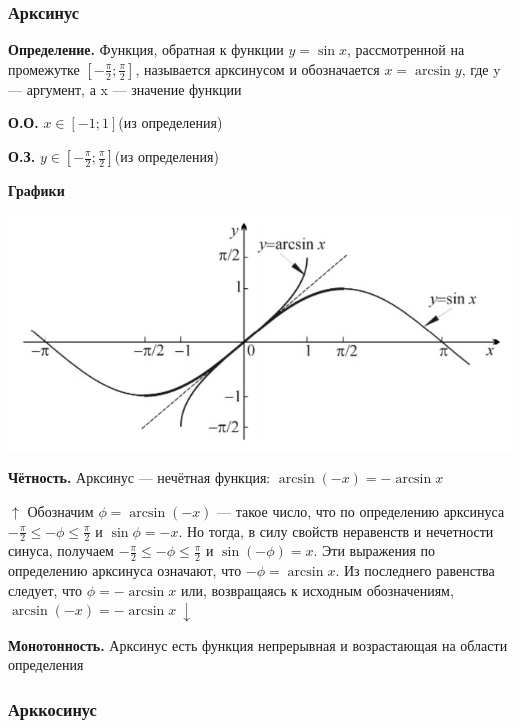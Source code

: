 \documentclass{article}
\begin{document}
        \subsubsection{Арксинус}
        
        \textbf{Определение.} Функция, обратная к функции \(y = \sin x\), рассмотренной на промежутке \([-\frac{\pi}{2}; \frac{\pi}{2}]\), называется арксинусом и обозначается \(x = \arcsin y\), где y --- аргумент, а x --- значение функции
    	
        \textbf{О.О.} \(x \in [-1; 1]\)(из определения)
        
        \textbf{О.З.} \(y \in [-\frac{\pi}{2}; \frac{\pi}{2}]\)(из определения)
        
        \textbf{Графики}
        \begin{center}
            \includegraphics[scale=0.4]{4}
        \end{center}
        
        \textbf{Чётность.} Арксинус --- нечётная функция: \(\arcsin{(-x)} = -\arcsin x\)
        
        \(\uparrow\) Обозначим \(\phi = \arcsin{(-x)}\) --- такое число, что по определению арксинуса \(-\frac{\pi}{2} \leq -\phi \leq \frac{\pi}{2}\) и \(\sin{\phi} = -x\). Но тогда, в силу свойств неравенств и нечетности синуса, получаем
        \(-\frac{\pi}{2} \leq -\phi \leq \frac{\pi}{2}\) и \(\sin{(-\phi)} = x\). Эти выражения по определению арксинуса означают, что \(-\phi = \arcsin x\).
        Из последнего равенства следует, что \(\phi = -\arcsin x\) или, возвращаясь к исходным обозначениям, \(\arcsin{(-x)} = -\arcsin x\ \downarrow\)
        
        \textbf{Монотонность.} Арксинус есть функция непрерывная и возрастающая на области определения
        
        \subsubsection{Арккосинус}
        
\end{document}
